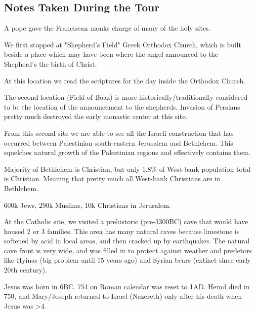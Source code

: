 \documentclass[letterpaper]{report}
\begin{document}
\begin{multicols}{2}
\subsection{Notes Taken During the Tour}
A pope gave the Franciscan monks charge of many of the holy sites.

We first stopped at "Shepherd's Field" Greek Orthodox Church, which is built beside a place which may have been where the angel announced to the Shepherd's the birth of Christ.

At this location we read the scriptures for the day inside the Orthodox Church.

The second location (Field of Boaz) is more historically/traditionally considered to be the location of the announcement to the shepherds.
Invasion of Persians pretty much destroyed the early monastic center at this site.

From this second site we are able to see all the Israeli construction that has occurred between Palestinian south-eastern Jerusalem and Bethlehem. This squelches natural growth of the Palestinian regions and effectively contains them.

Majority of Bethlehem is Christian, but only 1.8\% of West-bank population total is Christian. Meaning that pretty much all West-bank Christians are in Bethlehem.

600k Jews, 290k Muslims, 10k Christians in Jerusalem.

At the Catholic site, we visited a prehistoric (pre-3300BC) cave that would have housed 2 or 3 families. This area has many natural caves because limestone is softened by acid in local areas, and then cracked up by earthquakes. The natural cave front is very wide, and was filled in to protect against weather and predetors like Hyinas (big problem until 15 years ago) and Syrian bears (extinct since early 20th century).

Jesus was born in 6BC. 754 on Roman calendar was reset to 1AD. Herod died in 750, and Mary/Joseph returned to Israel (Nazereth) only after his death when Jesus was >4.
\end{multicols}
\end{document}
